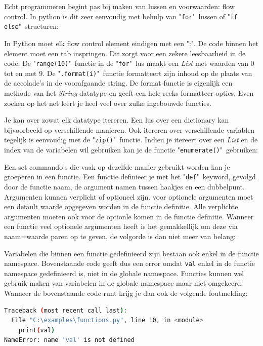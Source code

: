 \documentclass[11pt,twoside]{article}
\begin{document}
Echt programmeren begint pas bij maken van lussen en voorwaarden: flow control. In python is dit zeer eenvoudig met behulp van "\lstinline{for}"\ lussen of "\lstinline{if else}"\ structuren:


In Python moet elk flow control element eindigen met een ":". De code binnen het element moet een tab inspringen. Dit zorgt voor een zekere leesbaarheid in de code. De "\lstinline{range(10)}"\ functie in de "\lstinline{for}"\ lus maakt een \emph{List} met waarden van 0 tot en met 9. De "\lstinline{.format(i)}"\ functie formatteert zijn inhoud op de plaats van de accolade's in de voorafgaande string. De format functie is eigenlijk een methode van het \emph{String} datatype en geeft een hele reeks formatteer opties. Even zoeken op het net leert je heel veel over zulke ingebouwde functies.

Je kan over zowat elk datatype itereren. Een lus over een dictionary kan bijvoorbeeld op verschillende manieren. Ook itereren over verschillende variablen tegelijk is eenvoudig met de "\lstinline{zip()}"\ functie. Indien je itereert over een \emph{List} en de index van de variabelen wil gebruiken kan je de functie "\lstinline{enumerate()}"\ gebruiken:


Een set commando's die vaak op dezelfde manier gebruikt worden kan je groeperen in een functie. Een functie definieer je met het "\lstinline{def}"\ keyword, gevolgd door de functie naam, de argument namen tussen haakjes en een dubbelpunt. Argumenten kunnen verplicht of optioneel zijn. voor optionele argumenten moet een default waarde opgegeven worden in de functie definitie. Alle verplichte argumenten moeten ook voor de optionle komen in de functie definitie. Wanneer een functie veel optionele argumenten heeft is het gemakkellijk om deze via naam=waarde paren op te geven, de volgorde is dan niet meer van belang:


Variabelen die binnen een functie gedefinieerd zijn bestaan ook enkel in de functie namespace. Bovenstaande code geeft dus een error omdat \lstinline{val} enkel in de functie namespace gedefinieerd is, niet in de globale namespace. Functies kunnen wel gebruik maken van variabelen in de globale namespace maar niet omgekeerd. Wanneer de bovenstaande code runt krijg je dan ook de volgende foutmelding:
\begin{lstlisting}[language=bash]
Traceback (most recent call last):
  File "C:\examples\functions.py", line 10, in <module>
    print(val)
NameError: name 'val' is not defined
\end{lstlisting}
\end{document}
